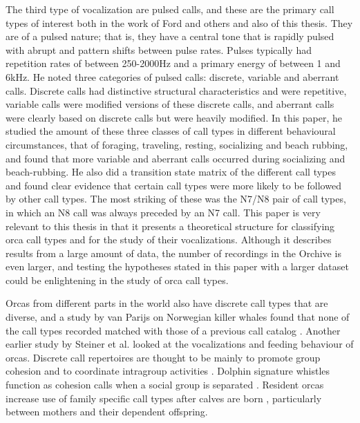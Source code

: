 \documentclass[12pt,oneside]{book}
\begin{document}
The third type of vocalization are pulsed calls, and these are the
primary call types of interest both in the work of Ford and others and
also of this thesis.  They are of a pulsed nature; that is, they have
a central tone that is rapidly pulsed with abrupt and pattern shifts
between pulse rates.  Pulses typically had repetition rates of between
250-2000Hz and a primary energy of between 1 and 6kHz.  He noted three
categories of pulsed calls: discrete, variable and aberrant calls.
Discrete calls had distinctive structural characteristics and were
repetitive, variable calls were modified versions of these discrete
calls, and aberrant calls were clearly based on discrete calls but
were heavily modified.  In this paper, he studied the amount of these
three classes of call types in different behavioural circumstances,
that of foraging, traveling, resting, socializing and beach rubbing,
and found that more variable and aberrant calls occurred during
socializing and beach-rubbing.  He also did a transition state matrix
of the different call types and found clear evidence that certain call
types were more likely to be followed by other call types.  The most
striking of these was the N7/N8 pair of call types, in which an N8
call was always preceded by an N7 call.  This paper is very relevant
to this thesis in that it presents a theoretical structure for
classifying orca call types and for the study of their vocalizations.
Although it describes results from a large amount of data, the number
of recordings in the Orchive is even larger, and testing the
hypotheses stated in this paper with a larger dataset could be
enlightening in the study of orca call types.

Orcas from different parts in the world also have discrete call types that
are diverse, and a study by van Parijs \cite{parijs2004norwegian} on
Norwegian killer whales found that none of the call types recorded matched
with those of a previous call catalog \cite{strager1995call}.  Another
earlier study by Steiner et al. \cite{steiner1979vocalizations} looked
at the vocalizations and feeding behaviour of orcas.  Discrete call
repertoires are thought to be mainly to promote group cohesion and to
coordinate intragroup activities \cite{ford1989acoustic}
\cite{ford1991vocal}.  Dolphin signature whistles function as cohesion
calls when a social group is separated \cite{janik1998context}
\cite{watwood2005signature}.  Resident orcas increase use of family
specific call types after calves are born \cite{weiss2006vocal},
particularly between mothers and their dependent offspring.
\end{document}
